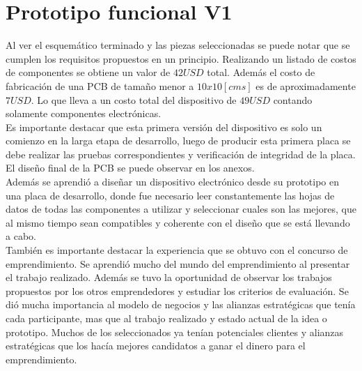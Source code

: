 \chapter{Prototipo funcional V1}\label{proto1}
Al ver el esquemático terminado y las piezas seleccionadas se puede notar que se cumplen los requisitos propuestos en un principio. Realizando un listado de costos de componentes se obtiene un valor de $42 USD$ total. Además el costo de fabricación de una PCB de tamaño menor a $10x10[cms]$ es de aproximadamente $7 USD$. Lo que lleva a un costo total del dispositivo de $49 USD$ contando solamente componentes electrónicas.\\
Es importante destacar que esta primera versión del dispositivo es solo un comienzo en la larga etapa de desarrollo, luego de producir esta primera placa se debe realizar las pruebas correspondientes y verificación de integridad de la placa.\\
El diseño final de la PCB se puede observar en los anexos.\\
Además se aprendió a diseñar un dispositivo electrónico desde su prototipo en una placa de desarrollo, donde fue necesario leer constantemente las hojas de datos de todas las componentes a utilizar y seleccionar cuales son las mejores, que al mismo tiempo sean compatibles y coherente con el diseño que se está llevando a cabo.\\
También es importante destacar la experiencia que se obtuvo con el concurso de emprendimiento. Se aprendió mucho del mundo del emprendimiento al presentar el trabajo realizado. Además se tuvo la oportunidad de observar los trabajos propuestos por los otros emprendedores y estudiar los criterios de evaluación. Se dió mucha importancia al modelo de negocios y las alianzas estratégicas que tenía cada participante, mas que al trabajo realizado y estado actual de la idea o prototipo. Muchos de los seleccionados ya tenían potenciales clientes y alianzas estratégicas que los hacía mejores candidatos a ganar el dinero para el emprendimiento.